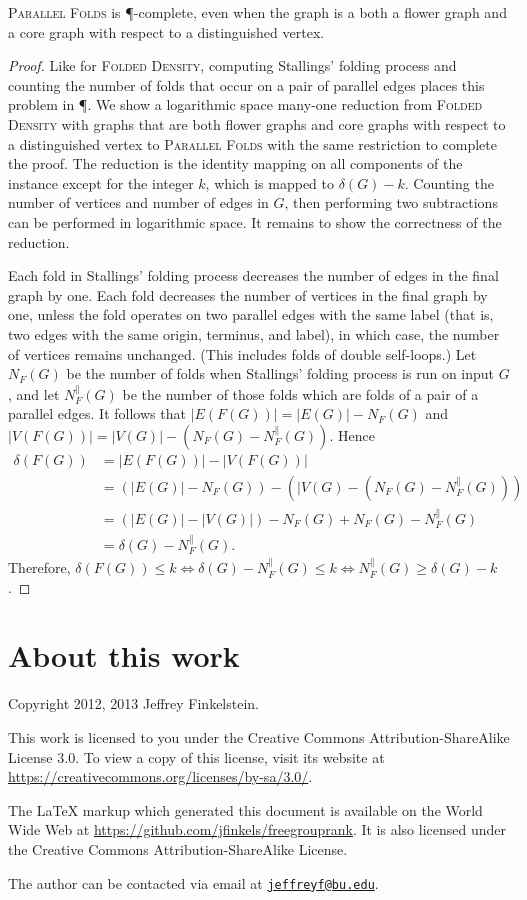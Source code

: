 \documentclass{article}
\newcommand{\email}[1]{\href{mailto:#1}{\nolinkurl{#1}}}
\newcommand{\FD}{\textsc{Folded Density}}
\newcommand{\PFolds}{\textsc{Parallel Folds}}
\begin{document}
\begin{theorem}
  \PFolds{} is \P-complete, even when the graph is a both a flower graph and a core graph with respect to a distinguished vertex.
\end{theorem}
\begin{proof}
  Like for \FD, computing Stallings' folding process and counting the number of folds that occur on a pair of parallel edges places this problem in \P.
  We show a logarithmic space many-one reduction from \FD{} with graphs that are both flower graphs and core graphs with respect to a distinguished vertex to \PFolds{} with the same restriction to complete the proof.
  The reduction is the identity mapping on all components of the instance except for the integer $k$, which is mapped to $\delta(G) - k$.
  Counting the number of vertices and number of edges in $G$, then performing two subtractions can be performed in logarithmic space.
  It remains to show the correctness of the reduction.

  Each fold in Stallings' folding process decreases the number of edges in the final graph by one.
  Each fold decreases the number of vertices in the final graph by one, unless the fold operates on two parallel edges with the same label (that is, two edges with the same origin, terminus, and label), in which case, the number of vertices remains unchanged.
  (This includes folds of double self-loops.)
  Let $N_F(G)$ be the number of folds when Stallings' folding process is run on input $G$, and let $N^\|_F(G)$ be the number of those folds which are folds of a pair of a parallel edges.
  It follows that $|E(F(G))| = |E(G)| - N_F(G)$ and $|V(F(G))| = |V(G)| - (N_F(G) - N^\|_F(G))$.
  Hence
  \begin{align*}
    \delta(F(G)) & = |E(F(G))| - |V(F(G))| \\
                 & = (|E(G)| - N_F(G)) - (|V(G) - (N_F(G) - N^\|_F(G))) \\
                 & = (|E(G)| - |V(G)|) - N_F(G) + N_F(G) - N^\|_F(G) \\
                 & = \delta(G) - N^\|_F(G).
  \end{align*}
  Therefore, $\delta(F(G)) \leq k \iff \delta(G) - N^\|_F(G) \leq k \iff N^\|_F(G) \geq \delta(G) - k$.
\end{proof}

\section{About this work}

Copyright 2012, 2013 Jef{}frey Finkelstein.

This work is licensed to you under the Creative Commons Attribution-ShareAlike License 3.0.
To view a copy of this license, visit its website at \mbox{\url{https://creativecommons.org/licenses/by-sa/3.0/}}.

The \LaTeX{} markup which generated this document is available on the World Wide Web at \mbox{\url{https://github.com/jfinkels/freegrouprank}}.
It is also licensed under the Creative Commons Attribution-ShareAlike License.

The author can be contacted via email at \email{jeffreyf@bu.edu}.



\end{document}
